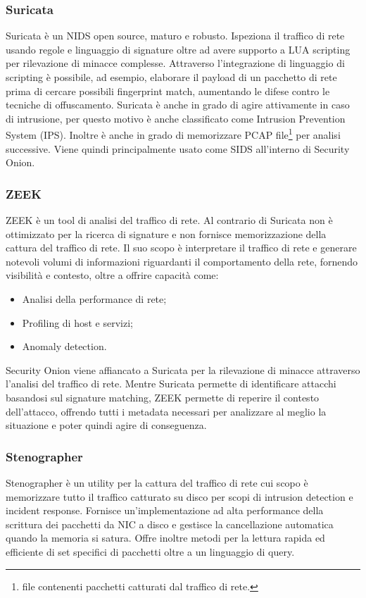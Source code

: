 \subsubsection*{Suricata}
Suricata \cite{suricata} è un NIDS open source, maturo e robusto. Ispeziona il traffico di rete usando regole e linguaggio di signature oltre ad avere supporto a LUA \cite{LUA} scripting per rilevazione di minacce complesse. Attraverso l'integrazione di linguaggio di scripting è possibile, ad esempio, elaborare il payload di un pacchetto di rete prima di cercare possibili fingerprint match, aumentando le difese contro le tecniche di offuscamento. 
Suricata è anche in grado di agire attivamente in caso di intrusione, per questo motivo è anche classificato come Intrusion Prevention System (IPS). Inoltre è anche in grado di memorizzare PCAP file\footnote{file contenenti pacchetti catturati dal traffico di rete.} per analisi successive.
Viene quindi principalmente usato come SIDS all'interno di Security Onion.
\subsubsection*{ZEEK}
ZEEK \cite{ZEEK} è un tool di analisi del traffico di rete. Al contrario di Suricata non è ottimizzato per la ricerca di signature e non fornisce memorizzazione della cattura del traffico di rete. Il suo scopo è interpretare il traffico di rete e generare notevoli volumi di informazioni riguardanti il comportamento della rete, fornendo visibilità e contesto, oltre a offrire capacità come:
\begin{itemize}
    \item Analisi della performance di rete;
    \item Profiling di host e servizi;
    \item Anomaly detection.
\end{itemize}
Security Onion viene affiancato a Suricata per la rilevazione di minacce attraverso l'analisi del traffico di rete. Mentre Suricata permette di identificare attacchi basandosi sul signature matching, ZEEK permette di reperire il contesto dell'attacco,  offrendo tutti i metadata necessari per analizzare al meglio la situazione e poter quindi agire di conseguenza.

\subsubsection*{Stenographer}
Stenographer \cite{stenographer} è un utility per la cattura del traffico di rete cui scopo è memorizzare tutto il traffico catturato su disco per scopi di intrusion detection e incident response.
Fornisce un'implementazione ad alta performance della scrittura dei pacchetti da NIC a disco e gestisce la cancellazione automatica quando la memoria si satura. 
Offre inoltre metodi per la lettura rapida ed efficiente di set specifici di pacchetti oltre a un linguaggio di query.


